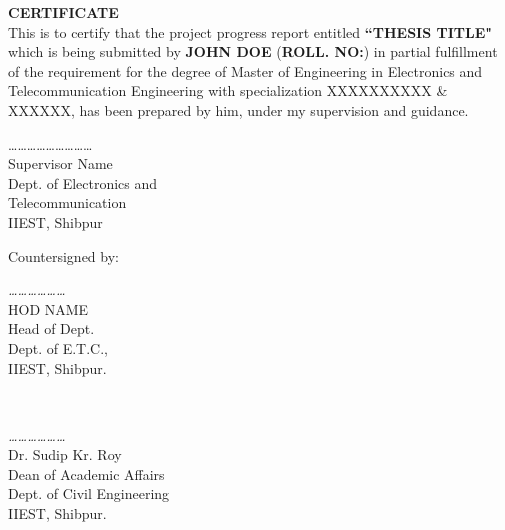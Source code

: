 \centering \textbf{CERTIFICATE}\\
\justify
This is to certify that the project progress report entitled \textbf{``THESIS TITLE"} which is being submitted by \textbf{JOHN DOE}
(\textbf{ROLL. NO:}) in partial fulfillment of the requirement for the degree of Master of Engineering in Electronics and Telecommunication Engineering with specialization XXXXXXXXXX \& XXXXXX, has been prepared by him, under my supervision and guidance.\\[2cm]
\justify

\centering
………………………
\\Supervisor Name
\\Dept. of Electronics and
\\Telecommunication
\\IIEST, Shibpur
\\[2cm]
\begin{flushleft}
    Countersigned by:\\[4cm]
\end{flushleft}

\begin{minipage}{0.45\textwidth}
    \begin{flushleft} \large
        \emph{………………}\\
        HOD NAME \\
        Head of Dept.\\
        Dept. of E.T.C.,\\
        IIEST, Shibpur.\\
    \end{flushleft}
\end{minipage}
~
\begin{minipage}{0.45\textwidth}
    \begin{flushright} \large
        \emph{………………}\\
        Dr. Sudip Kr. Roy\\
        Dean of Academic Affairs\\
        Dept. of Civil Engineering\\
        IIEST, Shibpur.\\
    \end{flushright}
\end{minipage}

\newpage